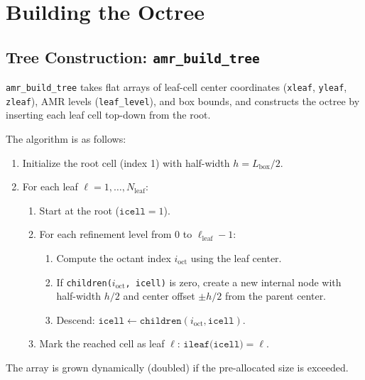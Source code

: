 \documentclass[english,a4paper]{my_memo}
\begin{document}
\section{Building the Octree}

\subsection{Tree Construction: \texttt{amr\_build\_tree}}
\label{sec:build_tree}

\begin{sloppypar}
\texttt{amr\_build\_tree} takes flat arrays of leaf-cell center coordinates
(\texttt{xleaf}, \texttt{yleaf}, \texttt{zleaf}), AMR levels
(\texttt{leaf\_level}), and box bounds, and constructs the octree by inserting
each leaf cell top-down from the root.
\end{sloppypar}

The algorithm is as follows:
\begin{enumerate}
  \item Initialize the root cell (index 1) with half-width $h = L_\mathrm{box}/2$.
  \item For each leaf $\ell = 1, \ldots, N_\mathrm{leaf}$:
  \begin{enumerate}
    \item Start at the root ($\texttt{icell} = 1$).
    \item For each refinement level from 0 to $\ell_\mathrm{leaf} - 1$:
    \begin{enumerate}
      \item Compute the octant index $i_\mathrm{oct}$ using the leaf center.
      \item If \texttt{children($i_\mathrm{oct}$, icell)} is zero, create a new
            internal node with half-width $h/2$ and center offset
            $\pm h/2$ from the parent center.
      \item Descend: $\texttt{icell} \leftarrow \texttt{children}(i_\mathrm{oct}, \texttt{icell})$.
    \end{enumerate}
    \item Mark the reached cell as leaf $\ell$: $\texttt{ileaf(icell)} = \ell$.
  \end{enumerate}
\end{enumerate}

The array is grown dynamically (doubled) if the pre-allocated size is exceeded.
\end{document}
